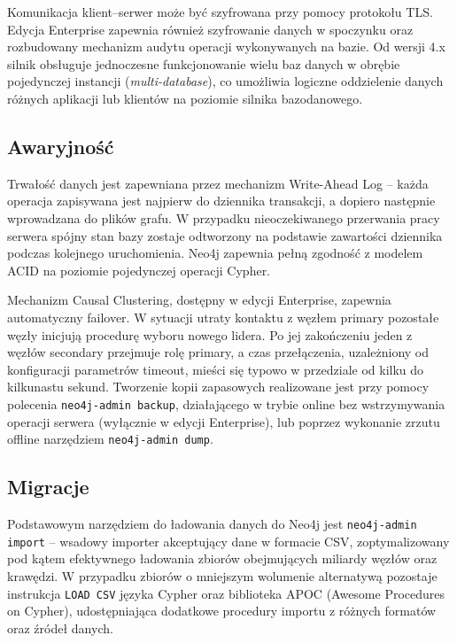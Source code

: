 Komunikacja klient–serwer może być szyfrowana przy pomocy protokołu TLS.
Edycja Enterprise zapewnia również szyfrowanie danych w spoczynku oraz
rozbudowany mechanizm audytu operacji wykonywanych na bazie. Od wersji 4.x
silnik obsługuje jednoczesne funkcjonowanie wielu baz danych w obrębie
pojedynczej instancji (\textit{multi-database}), co umożliwia logiczne
oddzielenie danych różnych aplikacji lub klientów na poziomie silnika
bazodanowego.

\subsection{Awaryjność}

Trwałość danych jest zapewniana przez mechanizm Write-Ahead Log -- każda
operacja zapisywana jest najpierw do dziennika transakcji, a dopiero
następnie wprowadzana do plików grafu. W przypadku nieoczekiwanego przerwania
pracy serwera spójny stan bazy zostaje odtworzony na podstawie zawartości
dziennika podczas kolejnego uruchomienia. Neo4j zapewnia pełną zgodność
z modelem ACID na poziomie pojedynczej operacji Cypher.

Mechanizm Causal Clustering, dostępny w edycji Enterprise, zapewnia automatyczny
failover. W sytuacji utraty kontaktu z węzłem primary pozostałe węzły inicjują
procedurę wyboru nowego lidera. Po jej zakończeniu jeden z węzłów secondary
przejmuje rolę primary, a czas przełączenia, uzależniony od konfiguracji
parametrów timeout, mieści się typowo w przedziale od kilku do kilkunastu
sekund. Tworzenie kopii zapasowych realizowane jest przy pomocy polecenia
\texttt{neo4j-admin backup}, działającego w trybie online bez wstrzymywania
operacji serwera (wyłącznie w edycji Enterprise), lub poprzez wykonanie
zrzutu offline narzędziem \texttt{neo4j-admin dump}.

\subsection{Migracje}

Podstawowym narzędziem do ładowania danych do Neo4j jest \texttt{neo4j-admin
import} -- wsadowy importer akceptujący dane w formacie CSV, zoptymalizowany
pod kątem efektywnego ładowania zbiorów obejmujących miliardy węzłów oraz
krawędzi. W przypadku zbiorów o mniejszym wolumenie alternatywą pozostaje
instrukcja \texttt{LOAD CSV} języka Cypher oraz biblioteka APOC (Awesome
Procedures on Cypher), udostępniająca dodatkowe procedury importu z różnych
formatów oraz źródeł danych.

